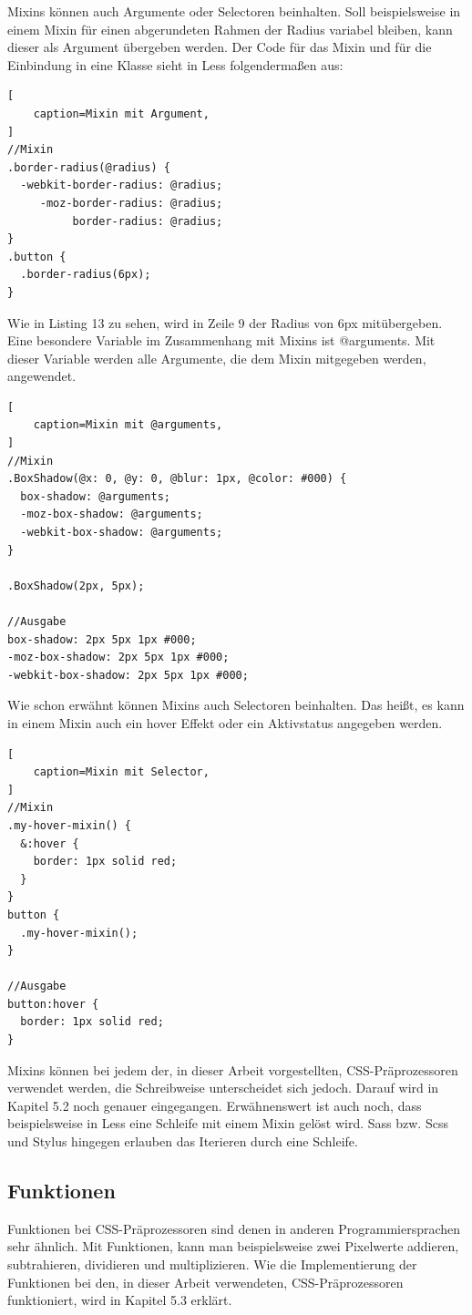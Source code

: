 Mixins können auch Argumente oder Selectoren beinhalten. \newline
Soll beispielsweise in einem Mixin für einen abgerundeten Rahmen der Radius variabel bleiben, kann dieser als Argument übergeben werden. Der Code für das Mixin und für die Einbindung in eine Klasse sieht in Less folgendermaßen aus:
\begin{lstlisting}[
	caption=Mixin mit Argument,
]
//Mixin
.border-radius(@radius) {
  -webkit-border-radius: @radius;
     -moz-border-radius: @radius;
          border-radius: @radius;
}
.button {
  .border-radius(6px);
}
\end{lstlisting}\autocite[]{Gerchev.2012}
Wie in Listing 13 zu sehen, wird in Zeile 9 der Radius von 6px mitübergeben. \autocite[]{thecorelessteam.}\newline 
Eine besondere Variable im Zusammenhang mit Mixins ist @arguments. Mit dieser Variable werden alle Argumente, die dem Mixin mitgegeben werden, angewendet. \autocite[]{Gerchev.2012}
\begin{lstlisting}[
	caption=Mixin mit @arguments,
]
//Mixin
.BoxShadow(@x: 0, @y: 0, @blur: 1px, @color: #000) {
  box-shadow: @arguments;
  -moz-box-shadow: @arguments;
  -webkit-box-shadow: @arguments;
}

.BoxShadow(2px, 5px);

//Ausgabe
box-shadow: 2px 5px 1px #000;
-moz-box-shadow: 2px 5px 1px #000;
-webkit-box-shadow: 2px 5px 1px #000;
\end{lstlisting} \autocite[]{Gerchev.2012}
Wie schon erwähnt können Mixins auch Selectoren beinhalten. Das heißt, es kann in einem Mixin auch ein hover Effekt oder ein Aktivstatus angegeben werden.
\begin{lstlisting}[
	caption=Mixin mit Selector,
]
//Mixin
.my-hover-mixin() {
  &:hover {
    border: 1px solid red;
  }
}
button {
  .my-hover-mixin();
}

//Ausgabe
button:hover {
  border: 1px solid red;
}
\end{lstlisting}\autocite[]{Gerchev.2012}
Mixins können bei jedem der, in dieser Arbeit vorgestellten, CSS-Präprozessoren verwendet werden, die Schreibweise unterscheidet sich jedoch. Darauf wird in Kapitel 5.2 noch genauer eingegangen.
Erwähnenswert ist auch noch, dass beispielsweise in Less eine Schleife mit einem Mixin gelöst wird. Sass bzw. Scss und Stylus hingegen erlauben das Iterieren durch eine Schleife.
\subsection{Funktionen}
Funktionen bei CSS-Präprozessoren sind denen in anderen Programmiersprachen sehr ähnlich. Mit Funktionen, kann man beispielsweise zwei Pixelwerte addieren, subtrahieren, dividieren und multiplizieren. Wie die Implementierung der Funktionen bei den, in dieser Arbeit verwendeten, CSS-Präprozessoren funktioniert, wird in Kapitel 5.3 erklärt.
